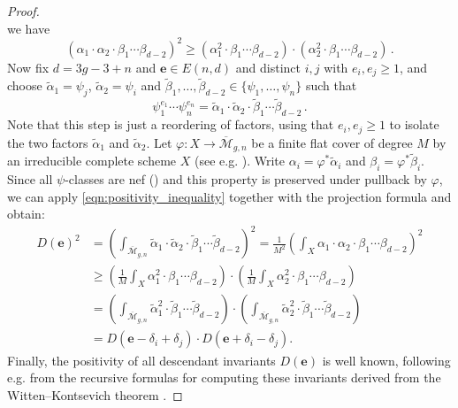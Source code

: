 \documentclass[12pt,reqno]{amsart}
\theoremstyle{definition}
\newcommand{\Mbar}{\overline{\mathcal{M}}}
\newcommand{\ee}{\mathbf{e}}
\begin{document}
\begin{humanparagraph}
\begin{proof}
\[\]
we have
\begin{equation} \label{eqn:positivity_inequality}
\left(\alpha_1 \cdot \alpha_2 \cdot \beta_1 \cdots \beta_{d-2} \right)^2 \geq \left(\alpha_1^2 \cdot \beta_1 \cdots \beta_{d-2} \right) \cdot \left(\alpha_2^2 \cdot \beta_1 \cdots \beta_{d-2} \right)\,.
\end{equation}
Now fix $d=3g-3+n$ and $\ee \in E(n,d)$ and distinct $i, j$ with $e_i, e_j \geq 1$, and choose $\widetilde \alpha_1 = \psi_j$, $\widetilde \alpha_2 = \psi_i$ and $\widetilde \beta_1, \ldots, \widetilde \beta_{d-2} \in \{\psi_1, \ldots, \psi_n\}$ such that
\[
\psi_1^{e_1} \cdots \psi_n^{e_n} = \widetilde \alpha_1 \cdot \widetilde \alpha_2 \cdot \widetilde \beta_1 \cdots \widetilde \beta_{d-2}\,.
\]
Note that this step is just a reordering of factors, using that $e_i, e_j \geq 1$ to isolate the two factors $\widetilde \alpha_1$ and $\widetilde \alpha_2$. Let $\varphi: X \to \Mbar_{g,n}$ be a finite flat cover of degree $M$ by an irreducible complete scheme $X$ (see e.g. \cite[Theorem 7.4.2]{MR2007376}). Write $\alpha_i = \varphi^* \widetilde \alpha_i$ and $\beta_i = \varphi^* \widetilde \beta_i$. Since all $\psi$-classes are nef (\cite[Chapter XIV, Corollary 5.14]{MR2807457}) and this property is preserved under pullback by $\varphi$, we can apply \eqref{eqn:positivity_inequality} together with the projection formula and obtain:
\begin{align*}
    D(\ee)^2 &=\left(\int_{\Mbar_{g,n}} \widetilde \alpha_1 \cdot \widetilde \alpha_2 \cdot \widetilde \beta_1 \cdots \widetilde \beta_{d-2} \right)^2 = \frac{1}{M^2} \left( \int_X \alpha_1 \cdot \alpha_2 \cdot \beta_1 \cdots \beta_{d-2} \right)^2\\
    &\geq \left(\frac{1}{M} \int_X \alpha_1^2 \cdot \beta_1 \cdots \beta_{d-2} \right) \cdot \left(\frac{1}{M} \int_X \alpha_2^2 \cdot \beta_1 \cdots \beta_{d-2} \right)\\
    &= \left(\int_{\Mbar_{g,n}} \widetilde \alpha_1^2 \cdot \widetilde \beta_1 \cdots \widetilde\beta_{d-2} \right) \cdot \left(\int_{\Mbar_{g,n}} \widetilde \alpha_2^2 \cdot \widetilde \beta_1 \cdots \widetilde\beta_{d-2} \right)\\ &= D(\ee - \delta_i + \delta_j) \cdot D(\ee + \delta_i - \delta_j).
\end{align*}
Finally, the positivity of all descendant invariants $D(\ee)$ is well known, following e.g. from the recursive formulas for computing these invariants derived from the Witten--Kontsevich theorem \cite{Witten1991, Kontsevich1992}.
\end{proof}
\end{humanparagraph}
\end{document}
